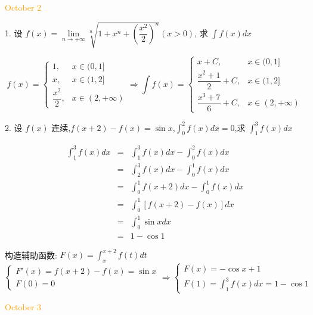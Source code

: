 \textcolor{orange}{October 2}

1. 设 $f(x)=\lim\limits_{n\to+\infty}\sqrt[n]{1+x^n+\left( \dfrac{x^2}{2}\right) ^n}(x>0)$, 求 $\int f(x)dx$

\begin{solution}
 
	$$f(x)=
	\begin{cases}
		1, &x\in(0,1]\\
		x, &x\in(1,2]\\
		\dfrac{x^2}{2}, &x\in(2,+\infty)  
	\end{cases}
	\Rightarrow 
	\int f(x)=
	\begin{cases}
		x+C, &x\in(0,1] \\
		\dfrac{x^2+1}{2}+C, &x\in(1,2] \\
		\dfrac{x^3+7}{6}+C, &x\in(2,+\infty)
	\end{cases}$$
\end{solution}


2. 设 $f(x)$ 连续,$f(x+2)-f(x)=\sin x$,$\displaystyle{\int_{0}^{2}f(x)dx=0}$,求 $\displaystyle{\int_{1}^{3}f(x)dx}$

\begin{solution}

	\begin{eqnarray*}
		\int_{1}^{3}f(x)dx
		& = & \int_{1}^{3}f(x)dx-\int_{0}^{2}f(x)dx \\
		& = & \int_{2}^{3}f(x)dx-\int_{0}^{1}f(x)dx \\
		& = & \int_{0}^{1}f(x+2)dx-\int_{0}^{1}f(x)dx \\
		& = & \int_{0}^{1}[f(x+2)-f(x)]dx \\
		& = & \int_{0}^{1}\sin xdx \\
		& = & 1-\cos 1
	\end{eqnarray*}
\end{solution}
\begin{anymark}[注]
	构造辅助函数: $\displaystyle{F(x)=\int_{x}^{x+2}f(t)dt}$  
	$$\begin{cases}
		F'(x) = f(x+2)-f(x) = \sin x\\
		F(0)  = 0
	\end{cases}\Rightarrow
	\begin{cases}
		F(x) = -\cos x+1 \\
		\displaystyle {F(1) = \int_{1}^{3}f(x)dx=1-\cos 1}
	\end{cases}$$
	\end{anymark}


\textcolor{orange}{October 3}

